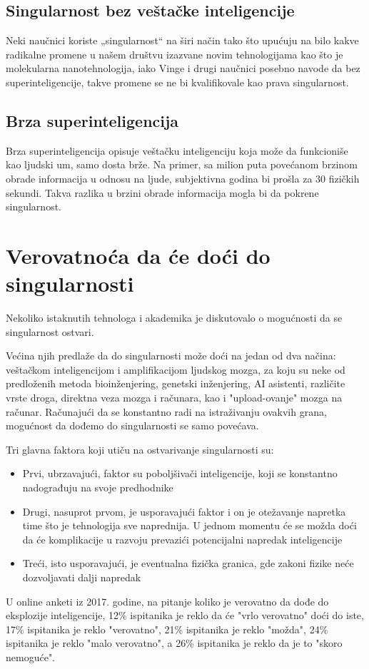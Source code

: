 \documentclass[a4paper]{article}
\begin{document}
\subsection{Singularnost bez veštačke inteligencije}

Neki naučnici koriste „singularnost“ na širi način tako što upućuju na bilo kakve radikalne promene u našem društvu izazvane novim tehnologijama kao što je molekularna nanotehnologija,\cite{ref 4} iako Vinge i drugi naučnici posebno navode da bez superinteligencije, takve promene se ne bi kvalifikovale kao prava singularnost.

\subsection{Brza superinteligencija}
Brza superinteligencija opisuje veštačku inteligenciju koja može da funkcioniše kao ljudski um, samo dosta brže. Na primer, sa milion puta povećanom brzinom obrade informacija u odnosu na ljude, subjektivna godina bi prošla za 30 fizičkih sekundi. Takva razlika u brzini obrade informacija mogla bi da pokrene singularnost.

\section{Verovatnoća da će doći do singularnosti}	
\label{sec:verovatnoća}
Nekoliko istaknutih tehnologa i akademika je diskutovalo o mogućnosti da se singularnost ostvari. 

Većina njih predlaže da do singularnosti može doći na jedan od dva načina: veštačkom inteligencijom i amplifikacijom ljudskog mozga, za koju su neke od predloženih metoda bioinženjering, genetski inženjering, AI asistenti, različite vrste droga, direktna veza mozga i računara, kao i "upload-ovanje" mozga na računar. Računajući da se konstantno radi na istraživanju ovakvih grana, mogućnost da dođemo do singularnosti se samo povećava. 

Tri glavna faktora koji utiču na ostvarivanje singularnosti su: \cite{mog-2}
\begin{itemize}
\item Prvi, ubrzavajući, faktor su poboljšivači inteligencije, koji se konstantno nadograđuju na svoje predhodnike 
\item Drugi, nasuprot prvom, je usporavajući faktor i on je otežavanje napretka time što je tehnologija sve naprednija. U jednom momentu će se možda doći da će komplikacije u razvoju prevazići potencijalni napredak inteligencije
\item Treći, isto usporavajući, je eventualna fizička granica, gde zakoni fizike neće dozvoljavati dalji napredak  
\end{itemize} 
U online anketi iz 2017. godine, na pitanje koliko je verovatno da dođe do eksplozije inteligencije, 12\% ispitanika je reklo da će "vrlo verovatno" doći do iste, 17\% ispitanika je reklo "verovatno", 21\% ispitanika je reklo "možda", 24\% ispitanika je reklo "malo verovatno", a 26\% ispitanika je reklo da je to "skoro nemoguće". \cite{mog-3}
\end{document}
